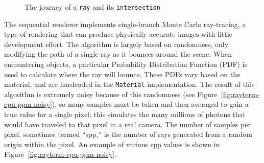 \begin{figure}[htb]
  \centering
  \caption{The journey of a \texttt{ray} and its \texttt{intersection}}
  \label{fig:rayterm-cpu-raytrace-journey-of-a-ray}
\end{figure}

 \label{ch:methods:renderer:sequential:algorithms}

The sequential renderer implements single-branch Monte Carlo ray-tracing, a type of rendering that can produce physically accurate images with little development effort.
The algorithm is largely based on randomness, only modifying the path of a single ray as it bounces around the scene.
When encountering objects, a particular Probability Distribution Function (PDF) is used to calculate where the ray will bounce.
These PDFs vary based on the material, and are hardcoded in the \texttt{Material} implementation.
The result of this algorithm is extremely noisy because of this randomness (see Figure~\ref{fig:rayterm-cpu-ppm-noisy}), so many samples must be taken and then averaged to gain a true value for a single pixel; this simulates the many millions of photons that would have traveled to that pixel in a real camera.
The number of samples per pixel, sometimes termed ``spp,'' is the number of rays generated from a random origin within the pixel.
An example of various spp values is shown in Figure~\ref{fig:rayterm-cpu-ppm-noisy}.

